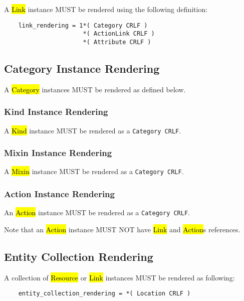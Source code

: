 \documentclass[10pt,a4paper]{article}
\begin{document}
A \hl{Link} instance MUST be rendered using the following definition:

\begin{verbatim}
	link_rendering = 1*( Category CRLF )
    	              *( ActionLink CRLF )
        	          *( Attribute CRLF )
\end{verbatim}


\subsection{Category Instance Rendering}
\label{sec:format_category_instance_rendering}

A \hl{Category} instances MUST be rendered as defined below.

\subsubsection{Kind Instance Rendering}
\label{sec:format_kind}

A \hl{Kind} instance MUST be rendered as a {\tt Category CRLF}.

\subsubsection{Mixin Instance Rendering}
\label{sec:format_mixin}

A \hl{Mixin} instance MUST be rendered as a {\tt Category CRLF}.

\subsubsection{Action Instance Rendering}
\label{sec:format_action}

An \hl{Action} instance MUST be rendered as a {\tt Category CRLF}.

Note that an \hl{Action} instance MUST NOT have \hl{Link} and \hl{Action}s references.

\subsection{Entity Collection Rendering}

A collection of \hl{Resource} or \hl{Link} instances MUST be rendered as following:

\begin{verbatim}
	entity_collection_rendering = *( Location CRLF )
\end{verbatim}
\end{document}
